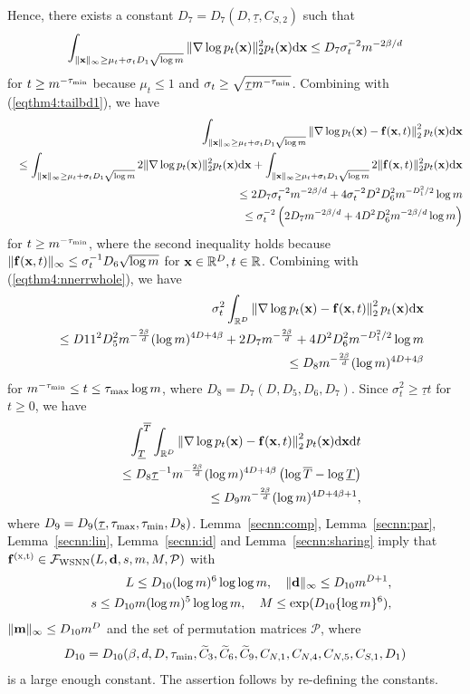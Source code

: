 \documentclass[twoside,11pt]{article}
\def\cF{\mathcal F}
\def\cP{\mathcal P}
\newcommand{\bd}{{\bf d}}
\newcommand{\bff}{{\bf f}}
\newcommand{\bfm}{{\bf m}}
\newcommand{\bx}{{\bf x}}
\newcommand{\bbR}{{\mathbb R}}
\newcommand{\bean}{\setlength\arraycolsep{1pt}\begin{eqnarray*}}
\newcommand{\eean}{\end{eqnarray*}}
\def\d{{\rm d}}
\begin{document}
Hence, there exists a constant $D_{7} = D_{7}(D, \underline{\tau}, C_{S,2})$ such that
\bean
\int_{\|\bx\|_{\infty} \geq \mu_{t} +  \sigma_{t} D_{1} \sqrt{\log m}} \| \nabla \log p_t(\bx) \|_2^2 p_t(\bx) \d \bx  \leq D_{7} \sigma_{t}^{-2} m^{-2\beta/d}
\eean
for $t \geq m^{-\tau_{\rm min}}$ because $\mu_{t} \leq 1$ and $\sigma_{t} \geq \sqrt{\underline{\tau} m^{-\tau_{\rm min}}}$.
Combining with (\ref{eqthm4:tailbd1}), we have
\bean
&& \int_{\|\bx\|_{\infty} \geq \mu_{t} +  \sigma_{t} D_{1} \sqrt{\log m}} \left\| \nabla \log p_t(\bx) -  \bff(\bx,t) \right\|_2^2 p_t(\bx) \d \bx  
\\
&& \leq \int_{\|\bx\|_{\infty} \geq \mu_{t} +  \sigma_{t} D_{1} \sqrt{\log m}} 2 \| \nabla \log p_t(\bx) \|_2^2 p_t(\bx) \d \bx + \int_{\|\bx\|_{\infty} \geq \mu_{t} +  \sigma_{t} D_{1} \sqrt{\log m}} 2 \| \bff(\bx,t) \|_2^2 p_t(\bx) \d \bx 
\\
&& \leq 2 D_{7} \sigma_{t}^{-2} m^{-2 \beta/d}
+ 4 \sigma_{t}^{-2} D^2 D_{6}^2 m^{-D_{1}^2 /2 } \log m
\\
&& \leq \sigma_{t}^{-2} \left( 2 D_{7} m^{-2 \beta/d}
+ 4 D^2 D_{6}^2 m^{-2\beta/d} \log m \right)
\eean
for $t \geq m^{-\tau_{\rm min}}$, where the second inequality holds because $\| \bff(\bx,t)\|_{\infty} \leq \sigma_{t}^{-1} D_{6} \sqrt{\log m}$ for $\bx \in \bbR^{D}, t \in \bbR$.
Combining with (\ref{eqthm4:nnerrwhole}), we have 
\bean
&& \sigma_{t}^2 \int_{\bbR^{D}} \left\| \nabla \log p_t(\bx) -  \bff(\bx,t) \right\|_2^2 p_t(\bx) \d \bx  
\\
&& \leq  D 11^2 D_{5}^2 m^{-\frac{2\beta}{d}} (\log m)^{4D +4\beta } + 2 D_{7} m^{-\frac{2\beta}{d}} + 4 D^2 D_{6}^2 m^{-D_{1}^2 /2 } \log m
\\
&& \leq D_{8} m^{-\frac{2\beta}{d}} (\log m)^{4D + 4\beta} 
\eean
for $m^{-\tau_{\rm min}} \leq t \leq \tau_{\rm max} \log m$, where $D_{8} = D_{7}(D, D_{5}, D_{6}, D_{7})$.
Since $\sigma_{t}^2 \geq \underline{\tau} t $ for $t \geq 0$, we have
\bean
&& \int_{\underline{T}}^{\overline{T}} \int_{\bbR^{D}} \left\| \nabla \log p_t(\bx) -  \bff(\bx,t) \right\|_2^2 p_t(\bx) \d \bx  \d t
\\
&& \leq  D_{8} \underline{\tau}^{-1} m^{-\frac{2\beta}{d}} (\log m)^{4D + 4\beta}  \left( \log \overline{T} - \log \underline {T} \right)
\\
&& \leq D_{9} m^{-\frac{2\beta}{d}} (\log m)^{4D + 4\beta + 1},
\eean
where $D_{9} = D_{9}(\underline{\tau}, \tau_{\rm max}, \tau_{\rm min}, D_{8})$.
Lemma~\ref{secnn:comp}, Lemma~\ref{secnn:par}, Lemma~\ref{secnn:lin}, Lemma~\ref{secnn:id} and Lemma~\ref{secnn:sharing} imply that $\bff^{(\rm x,t)}  \in \cF_{\rm WSNN}(L,\bd,s,m,M,\cP)$ with
\bean
&& L \leq D_{10} ( \log m )^{6} \log \log m , \quad \| \bd\|_{\infty} \leq D_{10} m^{D+1},
\\
&& s \leq D_{10}  m (\log m)^{5} \log \log m, \quad M \leq \exp(D_{10} \{ \log m \}^6 ),
\eean
$\| \bfm \|_{\infty} \leq D_{10} m^{D}$ and the set of permutation matrices $\cP$,
where 
\bean
D_{10} = D_{10}(\beta, d, D, \tau_{\rm min}, \widetilde C_{3}, \widetilde C_{6}, \widetilde C_{9}, C_{N,1}, C_{N,4}, C_{N,5}, C_{S,1}, D_{1})
\eean
is a large enough constant.
The assertion follows by re-defining the constants.
\hfill\BlackBox\\[2mm]
\end{document}
